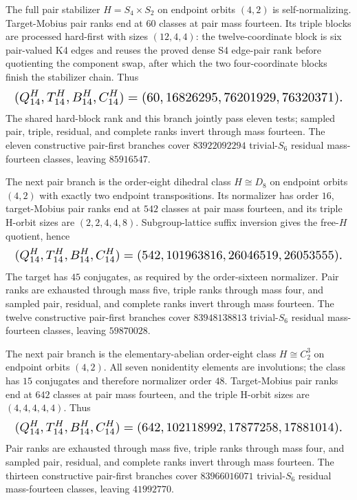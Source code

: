 \documentclass{article}
\newcommand{\fitmath}[1]{\resizebox{0.99\linewidth}{!}{$\displaystyle #1$}}
\begin{document}
The full pair stabilizer $H=S_4\times S_2$ on endpoint orbits $(4,2)$ is
self-normalizing. Target-Mobius pair ranks end at $60$ classes at pair mass
fourteen. Its triple blocks are processed hard-first with sizes $(12,4,4)$: the
twelve-coordinate block is six pair-valued K4 edges and reuses the proved dense
S4 edge-pair rank before quotienting the component swap, after which the two
four-coordinate blocks finish the stabilizer chain. Thus
\begin{equation}
  \fitmath{%
    (Q^H_{14},T^H_{14},B^H_{14},C^H_{14})
      =(60,16826295,76201929,76320371).
  }
  \label{eq:optimization-crazy-sextuple-s6-pair-s4-times-s2-ranking}
\end{equation}
The shared hard-block rank and this branch jointly pass eleven tests; sampled
pair, triple, residual, and complete ranks invert through mass fourteen. The
eleven constructive pair-first branches cover $83922092294$ trivial-$S_6$
residual mass-fourteen classes, leaving $85916547$.

The next pair branch is the order-eight dihedral class $H\cong D_8$ on endpoint
orbits $(4,2)$ with exactly two endpoint transpositions. Its normalizer has
order $16$, target-Mobius pair ranks end at $542$ classes at pair mass fourteen,
and its triple H-orbit sizes are $(2,2,4,4,8)$. Subgroup-lattice suffix
inversion gives the free-$H$ quotient, hence
\begin{equation}
  \fitmath{%
    (Q^H_{14},T^H_{14},B^H_{14},C^H_{14})
      =(542,101963816,26046519,26053555).
  }
  \label{eq:optimization-crazy-sextuple-s6-pair-d8-42-ranking}
\end{equation}
The target has $45$ conjugates, as required by the order-sixteen normalizer.
Pair ranks are exhausted through mass five, triple ranks through mass four, and
sampled pair, residual, and complete ranks invert through mass fourteen. The
twelve constructive pair-first branches cover $83948138813$ trivial-$S_6$
residual mass-fourteen classes, leaving $59870028$.

The next pair branch is the elementary-abelian order-eight class
$H\cong C_2^3$ on endpoint orbits $(4,2)$. All seven nonidentity elements are
involutions; the class has $15$ conjugates and therefore normalizer order $48$.
Target-Mobius pair ranks end at $642$ classes at pair mass fourteen, and the
triple H-orbit sizes are $(4,4,4,4,4)$. Thus
\begin{equation}
  \fitmath{%
    (Q^H_{14},T^H_{14},B^H_{14},C^H_{14})
      =(642,102118992,17877258,17881014).
  }
  \label{eq:optimization-crazy-sextuple-s6-pair-c2-cubed-42-ranking}
\end{equation}
Pair ranks are exhausted through mass five, triple ranks through mass four, and
sampled pair, residual, and complete ranks invert through mass fourteen. The
thirteen constructive pair-first branches cover $83966016071$ trivial-$S_6$
residual mass-fourteen classes, leaving $41992770$.
\end{document}
